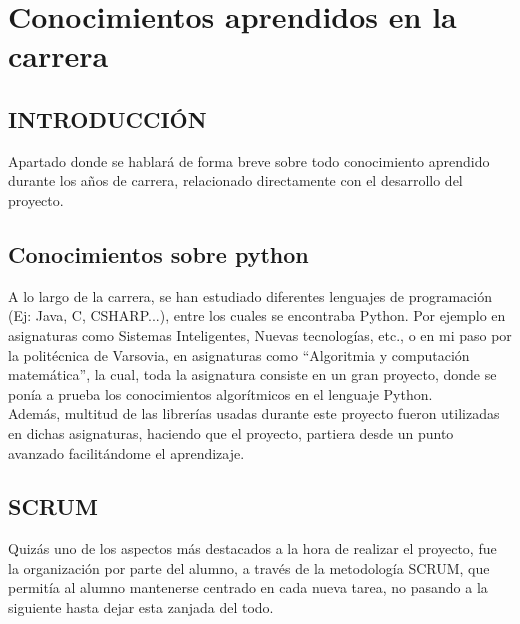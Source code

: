 \section{Conocimientos aprendidos en la carrera}
\subsection{INTRODUCCIÓN}
Apartado donde se hablará de forma breve sobre todo conocimiento aprendido durante los años de carrera, relacionado directamente con el desarrollo del proyecto.
\subsection{Conocimientos sobre python}
A lo largo de la carrera, se han estudiado diferentes lenguajes de programación (Ej: Java, C, CSHARP...), entre los cuales se encontraba Python. Por ejemplo en asignaturas como Sistemas Inteligentes, Nuevas tecnologías, etc., o en mi paso por la politécnica de Varsovia, en asignaturas como “Algoritmia y computación matemática”, la cual, toda la asignatura consiste en un gran proyecto, donde se ponía a prueba los conocimientos algorítmicos en el lenguaje Python.\\

Además, multitud de las librerías usadas durante este proyecto fueron utilizadas en dichas asignaturas, haciendo que el proyecto, partiera desde un punto avanzado facilitándome el aprendizaje.
\subsection{SCRUM}
Quizás uno de los aspectos más destacados a la hora de realizar el proyecto, fue la organización por parte del alumno, a través de la metodología SCRUM, que permitía al alumno mantenerse centrado en cada nueva tarea, no pasando a la siguiente hasta dejar esta zanjada del todo. \\

